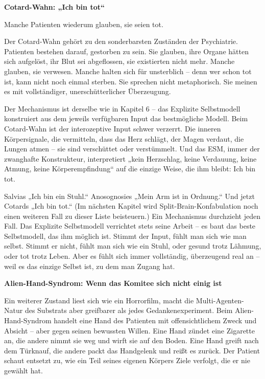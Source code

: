 \documentclass[11pt, twoside, openright]{book}
\begin{document}
\textbf{Cotard-Wahn: „Ich bin tot“}

Manche Patienten wiederum glauben, sie seien tot.

Der Cotard-Wahn gehört zu den sonderbarsten Zuständen der Psychiatrie. Patienten bestehen darauf, gestorben zu sein. Sie glauben, ihre Organe hätten sich aufgelöst, ihr Blut sei abgeflossen, sie existierten nicht mehr. Manche glauben, sie verwesen. Manche halten sich für unsterblich -- denn wer schon tot ist, kann nicht noch einmal sterben. Sie sprechen nicht metaphorisch. Sie meinen es mit vollständiger, unerschütterlicher Überzeugung.

Der Mechanismus ist derselbe wie in Kapitel 6 -- das Explizite Selbstmodell konstruiert aus dem jeweils verfügbaren Input das bestmögliche Modell. Beim Cotard-Wahn ist der interozeptive Input schwer verzerrt. Die inneren Körpersignale, die vermitteln, dass das Herz schlägt, der Magen verdaut, die Lungen atmen -- sie sind verschüttet oder verstümmelt. Und das ESM, immer der zwanghafte Konstrukteur, interpretiert „kein Herzschlag, keine Verdauung, keine Atmung, keine Körperempfindung“ auf die einzige Weise, die ihm bleibt: Ich bin tot.

Salvias „Ich bin ein Stuhl.“ Anosognosies „Mein Arm ist in Ordnung.“ Und jetzt Cotards „Ich bin tot.“ (Im nächsten Kapitel wird Split-Brain-Konfabulation noch einen weiteren Fall zu dieser Liste beisteuern.) Ein Mechanismus durchzieht jeden Fall. Das Explizite Selbstmodell verrichtet stets seine Arbeit -- es baut das beste Selbstmodell, das ihm möglich ist. Stimmt der Input, fühlt man sich wie man selbst. Stimmt er nicht, fühlt man sich wie ein Stuhl, oder gesund trotz Lähmung, oder tot trotz Leben. Aber es fühlt sich immer vollständig, überzeugend real an -- weil es das einzige Selbst ist, zu dem man Zugang hat.

\textbf{Alien-Hand-Syndrom: Wenn das Komitee sich nicht einig ist}

Ein weiterer Zustand liest sich wie ein Horrorfilm, macht die Multi-Agenten-Natur des Substrats aber greifbarer als jedes Gedankenexperiment. Beim Alien-Hand-Syndrom handelt eine Hand des Patienten mit offensichtlichem Zweck und Absicht -- aber gegen seinen bewussten Willen. Eine Hand zündet eine Zigarette an, die andere nimmt sie weg und wirft sie auf den Boden. Eine Hand greift nach dem Türknauf, die andere packt das Handgelenk und reißt es zurück. Der Patient schaut entsetzt zu, wie ein Teil seines eigenen Körpers Ziele verfolgt, die er nie gewählt hat.
\end{document}

